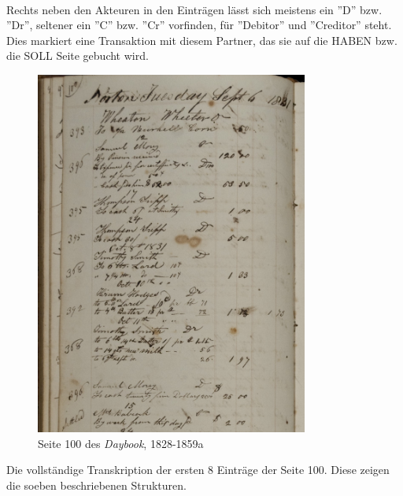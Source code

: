 \documentclass[12pt,a4paper]{article}
\begin{document}
\\
Rechts neben den Akteuren in den Einträgen lässt sich meistens ein ''D'' bzw. ''Dr'', seltener ein ''C'' bzw. ''Cr'' vorfinden, für ''Debitor'' und ''Creditor'' steht. Dies markiert eine Transaktion mit diesem Partner, das sie auf die HABEN bzw. die SOLL Seite gebucht wird.
\begin{figure}[H]
\centering
	\includegraphics[width=0.8\textwidth]{img/wheaton_100_101.jpg}  
    \caption[Seite 100 des \textit{Daybook, \protect\url{http://hdl.handle.net/11040/17982}}, 1828-1859]{Seite 100 des \textit{Daybook}, 1828-1859a} \label{fig:wheaton}
\end{figure}
Die vollständige Transkription der ersten 8 Einträge der Seite 100. Diese zeigen die soeben beschriebenen Strukturen.
\\
\\
\end{document}
